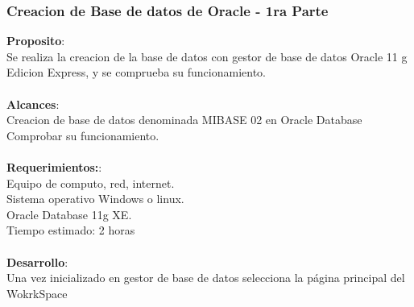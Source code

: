 \documentclass[12pt,letterpaper]{article}
\begin{document}
\subsubsection{Creacion de Base de datos de Oracle - 1ra Parte}

\textbf{Proposito}:\\
Se realiza la creacion de la base de datos con gestor de base de datos Oracle 11 g
Edicion Express, y se comprueba su funcionamiento.\\\\
\textbf{Alcances}:\\
Creacion de base de datos denominada MIBASE 02 en Oracle Database
Comprobar su funcionamiento.\\\\
\textbf{Requerimientos:}:\\
Equipo de computo, red, internet.\\
Sistema operativo Windows o linux.\\
Oracle Database 11g XE.\\
Tiempo estimado: 2 horas\\\\
\textbf{Desarrollo}:\\
Una vez inicializado en gestor de base de datos selecciona la p\'agina principal del
WokrkSpace\\
\end{document}
